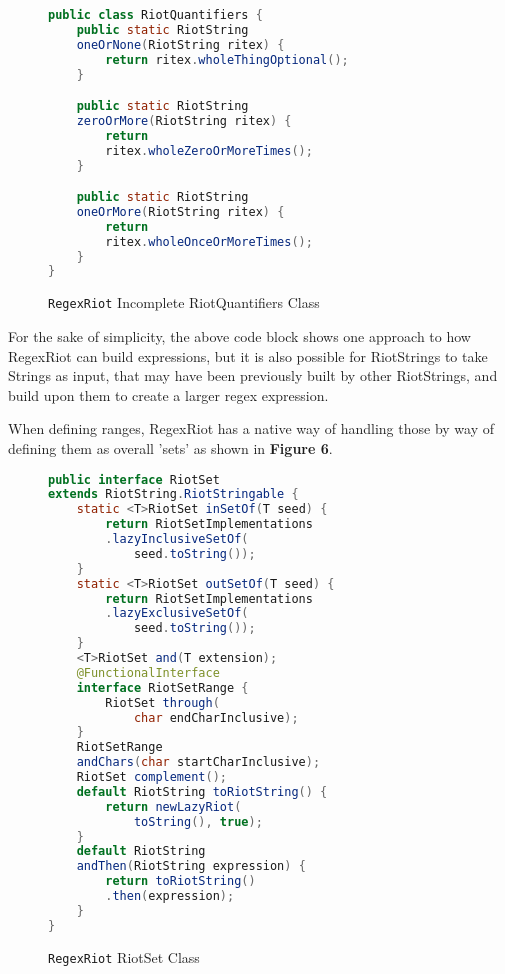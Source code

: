 \documentclass[conference]{IEEEtran}
\begin{document}
\begin{figure}[htbp]
    \centering
    \label{fig:regexriot-quantifiers}
    \begin{lstlisting}[language=Java]
public class RiotQuantifiers {
    public static RiotString 
    oneOrNone(RiotString ritex) {
        return ritex.wholeThingOptional();
    }

    public static RiotString 
    zeroOrMore(RiotString ritex) {
        return 
        ritex.wholeZeroOrMoreTimes();
    }

    public static RiotString 
    oneOrMore(RiotString ritex) {
        return 
        ritex.wholeOnceOrMoreTimes();
    }
}
           \end{lstlisting}
    \caption{\texttt{RegexRiot} Incomplete RiotQuantifiers Class}
\end{figure}

For the sake of simplicity, the above code block shows one approach to how 
RegexRiot can build expressions, but it is also possible for RiotStrings 
to take Strings as input, that may have been previously built by other 
RiotStrings, and build upon them to create a larger regex expression.

When defining ranges, RegexRiot has a native way of handling those by way 
of defining them as overall 'sets' as shown in \textbf{Figure 6}.

\begin{figure}[htbp]
    \centering
    \label{fig:regexriot-riotset}
    \begin{lstlisting}[language=Java]
public interface RiotSet 
extends RiotString.RiotStringable {
    static <T>RiotSet inSetOf(T seed) {
        return RiotSetImplementations
        .lazyInclusiveSetOf(
            seed.toString());
    }
    static <T>RiotSet outSetOf(T seed) {
        return RiotSetImplementations
        .lazyExclusiveSetOf(
            seed.toString());
    }
    <T>RiotSet and(T extension);
    @FunctionalInterface
    interface RiotSetRange {
        RiotSet through(
            char endCharInclusive);
    }
    RiotSetRange 
    andChars(char startCharInclusive);
    RiotSet complement();
    default RiotString toRiotString() {
        return newLazyRiot(
            toString(), true);
    }
    default RiotString 
    andThen(RiotString expression) {
        return toRiotString()
        .then(expression);
    }
}
                   \end{lstlisting}
    \caption{\texttt{RegexRiot} RiotSet Class}
\end{figure}
\end{document}
